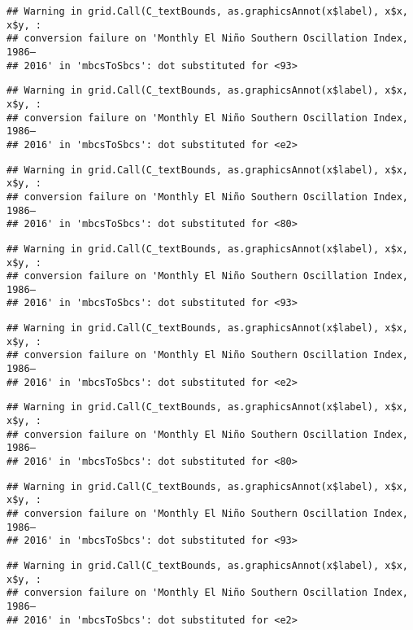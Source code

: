 \documentclass[]{article}
\theoremstyle{definition}
\theoremstyle{definition}
\theoremstyle{definition}
\theoremstyle{remark}
\begin{document}
\begin{verbatim}
## Warning in grid.Call(C_textBounds, as.graphicsAnnot(x$label), x$x, x$y, :
## conversion failure on 'Monthly El Niño Southern Oscillation Index, 1986–
## 2016' in 'mbcsToSbcs': dot substituted for <93>
\end{verbatim}

\begin{verbatim}
## Warning in grid.Call(C_textBounds, as.graphicsAnnot(x$label), x$x, x$y, :
## conversion failure on 'Monthly El Niño Southern Oscillation Index, 1986–
## 2016' in 'mbcsToSbcs': dot substituted for <e2>
\end{verbatim}

\begin{verbatim}
## Warning in grid.Call(C_textBounds, as.graphicsAnnot(x$label), x$x, x$y, :
## conversion failure on 'Monthly El Niño Southern Oscillation Index, 1986–
## 2016' in 'mbcsToSbcs': dot substituted for <80>
\end{verbatim}

\begin{verbatim}
## Warning in grid.Call(C_textBounds, as.graphicsAnnot(x$label), x$x, x$y, :
## conversion failure on 'Monthly El Niño Southern Oscillation Index, 1986–
## 2016' in 'mbcsToSbcs': dot substituted for <93>
\end{verbatim}

\begin{verbatim}
## Warning in grid.Call(C_textBounds, as.graphicsAnnot(x$label), x$x, x$y, :
## conversion failure on 'Monthly El Niño Southern Oscillation Index, 1986–
## 2016' in 'mbcsToSbcs': dot substituted for <e2>
\end{verbatim}

\begin{verbatim}
## Warning in grid.Call(C_textBounds, as.graphicsAnnot(x$label), x$x, x$y, :
## conversion failure on 'Monthly El Niño Southern Oscillation Index, 1986–
## 2016' in 'mbcsToSbcs': dot substituted for <80>
\end{verbatim}

\begin{verbatim}
## Warning in grid.Call(C_textBounds, as.graphicsAnnot(x$label), x$x, x$y, :
## conversion failure on 'Monthly El Niño Southern Oscillation Index, 1986–
## 2016' in 'mbcsToSbcs': dot substituted for <93>
\end{verbatim}

\begin{verbatim}
## Warning in grid.Call(C_textBounds, as.graphicsAnnot(x$label), x$x, x$y, :
## conversion failure on 'Monthly El Niño Southern Oscillation Index, 1986–
## 2016' in 'mbcsToSbcs': dot substituted for <e2>
\end{verbatim}
\end{document}

